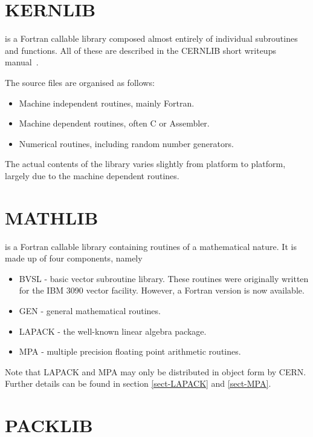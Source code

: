 \section{KERNLIB}

\KERNLIB{} is a Fortran callable library composed almost entirely
of individual subroutines and functions. All of these are described
in the CERNLIB short writeups manual~\cite{bib-CERNLIB}.

The \KERNLIB source files are organised as follows:
\begin{itemize}
\item
Machine independent routines, mainly Fortran.
\item
Machine dependent routines, often C or Assembler.
\item
Numerical routines, including random number generators.
\end{itemize}

The actual contents of the library varies slightly from
platform to platform, largely due to the machine 
dependent routines.

%
%

\section{MATHLIB}

\MATHLIB{} is a Fortran callable library containing routines
of a mathematical nature. It is made up of four components,
namely

\begin{itemize}
\item
BVSL - basic vector subroutine library. These routines
were originally written for the IBM 3090 vector facility.
However, a Fortran version is now available.
\item
GEN - general mathematical routines.
\item
LAPACK - the well-known linear algebra package.
\item
MPA - multiple precision floating point arithmetic routines.
\end{itemize}

Note that LAPACK and MPA may only be distributed in object form
by CERN. Further details can be found in section \ref{sect-LAPACK}
and \ref{sect-MPA}.

\section{PACKLIB}

